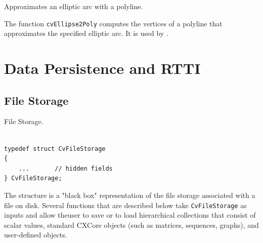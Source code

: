 Approximates an elliptic arc with a polyline.


\begin{description}
\end{description}

The function \texttt{cvEllipse2Poly} computes the vertices of a polyline that approximates the specified elliptic arc. It is used by .

\fi

\section{Data Persistence and RTTI}

\ifC
\subsection{File Storage}

\label{CvFileStorage}

File Storage.

\begin{lstlisting}

typedef struct CvFileStorage
{
    ...       // hidden fields
} CvFileStorage;

\end{lstlisting}

The structure  is a "black box" representation
of the file storage associated with a file on disk. Several
functions that are described below take \texttt{CvFileStorage} as
inputs and allow theuser to save or to load hierarchical collections
that consist of scalar values, standard CXCore objects (such as
matrices, sequences, graphs), and user-defined objects.

